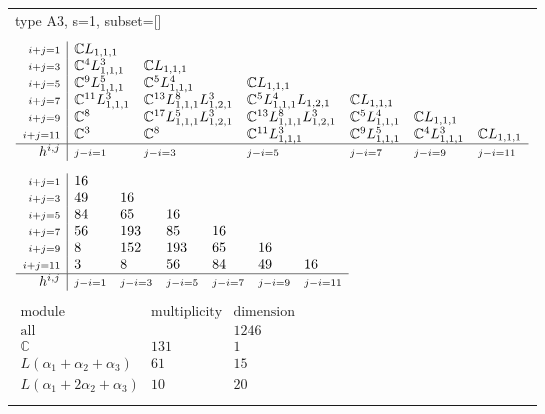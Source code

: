 \documentclass[crop,border=2mm]{standalone}
\begin{document}
\begin{tabular}{l}
{\huge type A3, s=1, subset=[]}\\ \\


$\displaystyle
\begin{array}{r|l l l l l l}
	{\scriptstyle i+j=1}&\mathbb{C}L_{1,1,1}&&&&&\\
	{\scriptstyle i+j=3}&\mathbb{C}^{4}L_{1,1,1}^{3}&\mathbb{C}L_{1,1,1}&&&&\\
	{\scriptstyle i+j=5}&\mathbb{C}^{9}L_{1,1,1}^{5}&\mathbb{C}^{5}L_{1,1,1}^{4}&\mathbb{C}L_{1,1,1}&&&\\
	{\scriptstyle i+j=7}&\mathbb{C}^{11}L_{1,1,1}^{3}&\mathbb{C}^{13}L_{1,1,1}^{8}L_{1,2,1}^{3}&\mathbb{C}^{5}L_{1,1,1}^{4}L_{1,2,1}&\mathbb{C}L_{1,1,1}&&\\
	{\scriptstyle i+j=9}&\mathbb{C}^{8}&\mathbb{C}^{17}L_{1,1,1}^{5}L_{1,2,1}^{3}&\mathbb{C}^{13}L_{1,1,1}^{8}L_{1,2,1}^{3}&\mathbb{C}^{5}L_{1,1,1}^{4}&\mathbb{C}L_{1,1,1}&\\
	{\scriptstyle i+j=11}&\mathbb{C}^{3}&\mathbb{C}^{8}&\mathbb{C}^{11}L_{1,1,1}^{3}&\mathbb{C}^{9}L_{1,1,1}^{5}&\mathbb{C}^{4}L_{1,1,1}^{3}&\mathbb{C}L_{1,1,1}\\
	\hline h^{i,j}&{\scriptstyle j-i=1}&{\scriptstyle j-i=3}&{\scriptstyle j-i=5}&{\scriptstyle j-i=7}&{\scriptstyle j-i=9}&{\scriptstyle j-i=11}
\end{array}
$ \\ \\


$\displaystyle
\begin{array}{r|l l l l l l}
	{\scriptstyle i+j=1}&16&&&&&\\
	{\scriptstyle i+j=3}&49&16&&&&\\
	{\scriptstyle i+j=5}&84&65&16&&&\\
	{\scriptstyle i+j=7}&56&193&85&16&&\\
	{\scriptstyle i+j=9}&8&152&193&65&16&\\
	{\scriptstyle i+j=11}&3&8&56&84&49&16\\
	\hline h^{i,j}&{\scriptstyle j-i=1}&{\scriptstyle j-i=3}&{\scriptstyle j-i=5}&{\scriptstyle j-i=7}&{\scriptstyle j-i=9}&{\scriptstyle j-i=11}
\end{array}
$ \\ \\


$\displaystyle
\begin{array}{rll}
	\text{module}&\text{multiplicity}&\text{dimension} \\ \hline \text{all}&&1246 \\
	\mathbb{C}&131&1\\
	L\left(\alpha_{1}+\alpha_{2}+\alpha_{3}\right)&61&15\\
	L\left(\alpha_{1}+ 2\alpha_{2}+\alpha_{3}\right)&10&20
\end{array}
$ \\ \\

\end{tabular}
\end{document}
